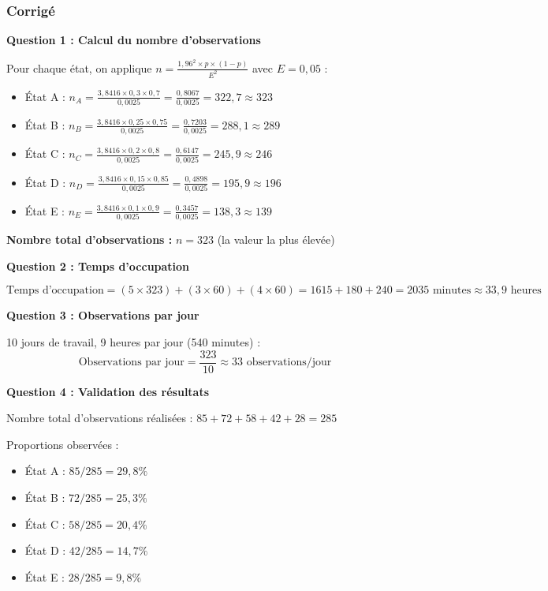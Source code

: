 \documentclass[a4paper,12pt]{article}
\begin{document}
\subsubsection{Corrigé}

\textbf{Question 1 : Calcul du nombre d'observations}

Pour chaque état, on applique $n = \frac{1,96^2 \times p \times (1-p)}{E^2}$ avec $E = 0,05$ :

\begin{itemize}
    \item État A : $n_A = \frac{3,8416 \times 0,3 \times 0,7}{0,0025} = \frac{0,8067}{0,0025} = 322,7 \approx 323$
    \item État B : $n_B = \frac{3,8416 \times 0,25 \times 0,75}{0,0025} = \frac{0,7203}{0,0025} = 288,1 \approx 289$
    \item État C : $n_C = \frac{3,8416 \times 0,2 \times 0,8}{0,0025} = \frac{0,6147}{0,0025} = 245,9 \approx 246$
    \item État D : $n_D = \frac{3,8416 \times 0,15 \times 0,85}{0,0025} = \frac{0,4898}{0,0025} = 195,9 \approx 196$
    \item État E : $n_E = \frac{3,8416 \times 0,1 \times 0,9}{0,0025} = \frac{0,3457}{0,0025} = 138,3 \approx 139$
\end{itemize}

\textbf{Nombre total d'observations :} $n = 323$ (la valeur la plus élevée)

\textbf{Question 2 : Temps d'occupation}

\[
\text{Temps d'occupation} = (5 \times 323) + (3 \times 60) + (4 \times 60) = 1615 + 180 + 240 = 2035 \text{ minutes} \approx 33,9 \text{ heures}
\]

\textbf{Question 3 : Observations par jour}

10 jours de travail, 9 heures par jour (540 minutes) :
\[
\text{Observations par jour} = \frac{323}{10} \approx 33 \text{ observations/jour}
\]

\textbf{Question 4 : Validation des résultats}

Nombre total d'observations réalisées : $85 + 72 + 58 + 42 + 28 = 285$

Proportions observées :
\begin{itemize}
    \item État A : $85/285 = 29,8\%$
    \item État B : $72/285 = 25,3\%$
    \item État C : $58/285 = 20,4\%$
    \item État D : $42/285 = 14,7\%$
    \item État E : $28/285 = 9,8\%$
\end{itemize}
\end{document}
